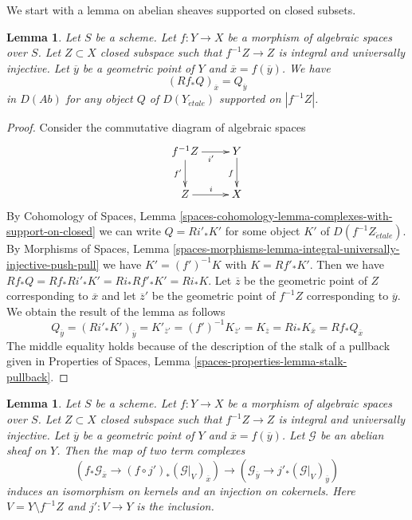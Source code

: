 \documentclass{stacks-project}
\theoremstyle{plain}
\newtheorem{lemma}[subsection]{Lemma}
\theoremstyle{definition}
\theoremstyle{remark}
\numberwithin{equation}{subsection}
\def\etale{{\acute{e}tale}}
\begin{document}
\medskip\noindent
We start with a lemma on abelian sheaves supported on closed subsets.

\begin{lemma}
\label{lemma-stalk-pushforward-with-support}
Let $S$ be a scheme. Let $f : Y \to X$ be a morphism of algebraic spaces
over $S$. Let $Z \subset X$ closed subspace such that $f^{-1}Z \to Z$ is
integral and universally injective. Let $\overline{y}$ be a geometric point
of $Y$ and $\overline{x} = f(\overline{y})$. We have
$$
(Rf_*Q)_{\overline{x}} = Q_{\overline{y}}
$$
in $D(\textit{Ab})$ for any object $Q$ of $D(Y_\etale)$ supported
on $|f^{-1}Z|$.
\end{lemma}

\begin{proof}
Consider the commutative diagram of algebraic spaces
$$
\xymatrix{
f^{-1}Z \ar[r]_{i'} \ar[d]_{f'} & Y \ar[d]_f \\
Z \ar[r]^i & X
}
$$
By Cohomology of Spaces, Lemma
\ref{spaces-cohomology-lemma-complexes-with-support-on-closed} we can write
$Q = Ri'_*K'$ for some object $K'$ of $D(f^{-1}Z_\etale)$.
By Morphisms of Spaces, Lemma
\ref{spaces-morphisms-lemma-integral-universally-injective-push-pull}
we have $K' = (f')^{-1}K$ with $K = Rf'_*K'$.
Then we have $Rf_*Q = Rf_*Ri'_*K' = Ri_*Rf'_*K' = Ri_*K$.
Let $\overline{z}$ be the geometric point of $Z$ corresponding
to $\overline{x}$ and let $\overline{z}'$ be the geometric point
of $f^{-1}Z$ corresponding to $\overline{y}$. We obtain
the result of the lemma as follows
$$
Q_{\overline{y}} = (Ri'_*K')_{\overline{y}} = K'_{\overline{z}'} =
(f')^{-1}K_{\overline{z}'} = K_{\overline{z}} = Ri_*K_{\overline{x}} =
Rf_*Q_{\overline{x}}
$$
The middle equality holds because of the description of the stalk
of a pullback given in
Properties of Spaces, Lemma \ref{spaces-properties-lemma-stalk-pullback}.
\end{proof}

\begin{lemma}
\label{lemma-stalk-formal-glueing}
Let $S$ be a scheme. Let $f : Y \to X$ be a morphism of algebraic spaces
over $S$. Let $Z \subset X$ closed subspace such that $f^{-1}Z \to Z$ is
integral and universally injective. Let $\overline{y}$ be a geometric point
of $Y$ and $\overline{x} = f(\overline{y})$. Let $\mathcal{G}$
be an abelian sheaf on $Y$. Then the map of two term complexes
$$
\left(f_*\mathcal{G}_{\overline{x}} \to
(f \circ j')_*(\mathcal{G}|_V)_{\overline{x}}\right)
\longrightarrow
\left(\mathcal{G}_{\overline{y}} \to j'_*(\mathcal{G}|_V)_{\overline{y}}\right)
$$
induces an isomorphism on kernels and an injection on cokernels.
Here $V = Y \setminus f^{-1}Z$ and $j' : V \to Y$ is the inclusion.
\end{lemma}
\end{document}
